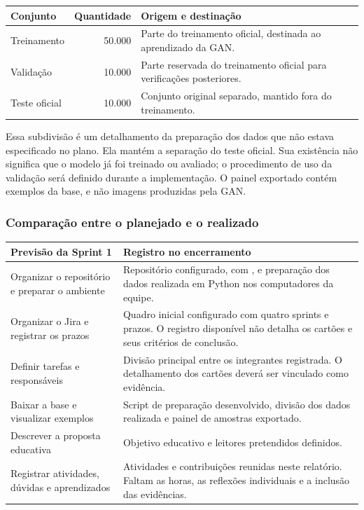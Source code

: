 \documentclass[12pt,a4paper]{article}
\begin{document}
\begin{center}
\small
\begin{tabularx}{\textwidth}{@{}YrY@{}}
\toprule
\textbf{Conjunto} & \textbf{Quantidade} & \textbf{Origem e destinação} \\
\midrule
Treinamento & 50.000 & Parte do treinamento oficial, destinada ao aprendizado da GAN. \\
Validação & 10.000 & Parte reservada do treinamento oficial para verificações posteriores. \\
Teste oficial & 10.000 & Conjunto original separado, mantido fora do treinamento. \\
\bottomrule
\end{tabularx}
\end{center}

Essa subdivisão é um detalhamento da preparação dos dados que não estava especificado no plano. Ela mantém a separação do teste oficial. Sua existência não significa que o modelo já foi treinado ou avaliado; o procedimento de uso da validação será definido durante a implementação. O painel exportado contém exemplos da base, e não imagens produzidas pela GAN.

\subsubsection{Comparação entre o planejado e o realizado}
\label{sec:comparacao}
\begin{center}
\small
\begin{tabularx}{\textwidth}{@{}>{\raggedright\arraybackslash}p{}Y@{}}
\toprule
\textbf{Previsão da Sprint 1} & \textbf{Registro no encerramento} \\
\midrule
Organizar o repositório e preparar o ambiente & Repositório configurado, com , e preparação dos dados realizada em Python nos computadores da equipe. \\
Organizar o Jira e registrar os prazos & Quadro inicial configurado com quatro sprints e prazos. O registro disponível não detalha os cartões e seus critérios de conclusão. \\
Definir tarefas e responsáveis & Divisão principal entre os integrantes registrada. O detalhamento dos cartões deverá ser vinculado como evidência. \\
Baixar a base e visualizar exemplos & Script de preparação desenvolvido, divisão dos dados realizada e painel de amostras exportado. \\
Descrever a proposta educativa & Objetivo educativo e leitores pretendidos definidos. \\
Registrar atividades, dúvidas e aprendizados & Atividades e contribuições reunidas neste relatório. Faltam as horas, as reflexões individuais e a inclusão das evidências. \\
\bottomrule
\end{tabularx}
\end{center}
\end{document}
